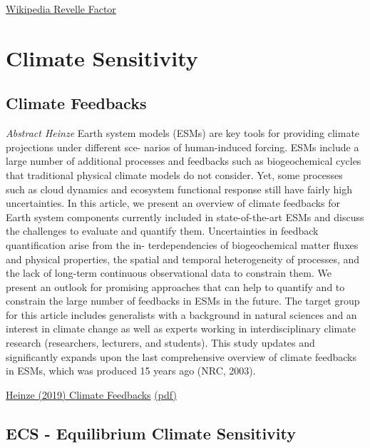 \documentclass[
]{book}
\begin{document}
\href{https://en.wikipedia.org/wiki/Revelle_factor}{Wikipedia Revelle Factor}

\hypertarget{climate-sensitivity}{%
\chapter{Climate Sensitivity}\label{climate-sensitivity}}

\hypertarget{climate-feedbacks}{%
\section{Climate Feedbacks}\label{climate-feedbacks}}

\emph{Abstract Heinze}
Earth system models (ESMs) are key tools for providing climate projections under different sce-
narios of human-induced forcing. ESMs include a large number of additional processes and feedbacks such as
biogeochemical cycles that traditional physical climate models do not consider. Yet, some processes such as
cloud dynamics and ecosystem functional response still have fairly high uncertainties. In this article, we present
an overview of climate feedbacks for Earth system components currently included in state-of-the-art ESMs and
discuss the challenges to evaluate and quantify them. Uncertainties in feedback quantification arise from the in-
terdependencies of biogeochemical matter fluxes and physical properties, the spatial and temporal heterogeneity
of processes, and the lack of long-term continuous observational data to constrain them. We present an outlook
for promising approaches that can help to quantify and to constrain the large number of feedbacks in ESMs in
the future. The target group for this article includes generalists with a background in natural sciences and an
interest in climate change as well as experts working in interdisciplinary climate research (researchers, lecturers,
and students). This study updates and significantly expands upon the last comprehensive overview of climate
feedbacks in ESMs, which was produced 15 years ago (NRC, 2003).

\href{https://www.researchgate.net/publication/334387499_ESD_Reviews_Climate_feedbacks_in_the_Earth_system_and_prospects_for_their_evaluation}{Heinze (2019) Climate Feedbacks}
\href{pdf/Heinze_2019_Climate_Feedbacks.pdf}{(pdf)}

\hypertarget{ecs---equilibrium-climate-sensitivity}{%
\section{ECS - Equilibrium Climate Sensitivity}\label{ecs---equilibrium-climate-sensitivity}}
\end{document}
